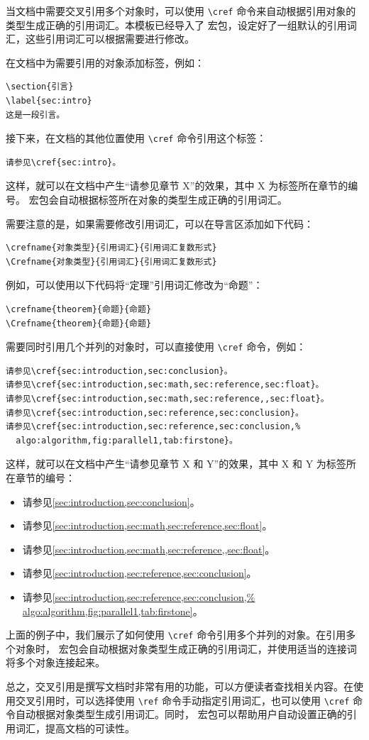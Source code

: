 当文档中需要交叉引用多个对象时，可以使用 \verb|\cref| 命令来自动根据引用对象的类型生成正确的引用词汇。本模板已经导入了  宏包，设定好了一组默认的引用词汇，这些引用词汇可以根据需要进行修改。

在文档中为需要引用的对象添加标签，例如：

\begin{verbatim}
\section{引言}
\label{sec:intro}
这是一段引言。
\end{verbatim}

接下来，在文档的其他位置使用 \verb|\cref| 命令引用这个标签：
\begin{verbatim}
请参见\cref{sec:intro}。
\end{verbatim}
这样，就可以在文档中产生“请参见章节 X”的效果，其中 X 为标签所在章节的编号。 宏包会自动根据标签所在对象的类型生成正确的引用词汇。

需要注意的是，如果需要修改引用词汇，可以在导言区添加如下代码：

\begin{verbatim}
\crefname{对象类型}{引用词汇}{引用词汇复数形式}
\Crefname{对象类型}{引用词汇}{引用词汇复数形式}
\end{verbatim}

例如，可以使用以下代码将“定理”引用词汇修改为“命题”：
\begin{verbatim}
\crefname{theorem}{命题}{命题}
\Crefname{theorem}{命题}{命题}
\end{verbatim}

需要同时引用几个并列的对象时，可以直接使用 \verb|\cref| 命令，例如：
\begin{verbatim}
请参见\cref{sec:introduction,sec:conclusion}。
请参见\cref{sec:introduction,sec:math,sec:reference,sec:float}。
请参见\cref{sec:introduction,sec:math,sec:reference,,sec:float}。
请参见\cref{sec:introduction,sec:reference,sec:conclusion}。
请参见\cref{sec:introduction,sec:reference,sec:conclusion,%
  algo:algorithm,fig:parallel1,tab:firstone}。
\end{verbatim}

这样，就可以在文档中产生“请参见章节 X 和 Y”的效果，其中 X 和 Y 为标签所在章节的编号：
\begin{itemize}
  \item 请参见\cref{sec:introduction,sec:conclusion}。
  \item 请参见\cref{sec:introduction,sec:math,sec:reference,sec:float}。
  \item 请参见\cref{sec:introduction,sec:math,sec:reference,,sec:float}。
  \item 请参见\cref{sec:introduction,sec:reference,sec:conclusion}。
  \item 请参见\cref{sec:introduction,sec:reference,sec:conclusion,%
        algo:algorithm,fig:parallel1,tab:firstone}。
\end{itemize}

上面的例子中，我们展示了如何使用 \verb|\cref| 命令引用多个并列的对象。在引用多个对象时， 宏包会自动根据对象类型生成正确的引用词汇，并使用适当的连接词将多个对象连接起来。

总之，交叉引用是撰写文档时非常有用的功能，可以方便读者查找相关内容。在使用交叉引用时，可以选择使用 \verb|\ref| 命令手动指定引用词汇，也可以使用 \verb|\cref| 命令自动根据对象类型生成引用词汇。同时， 宏包可以帮助用户自动设置正确的引用词汇，提高文档的可读性。
